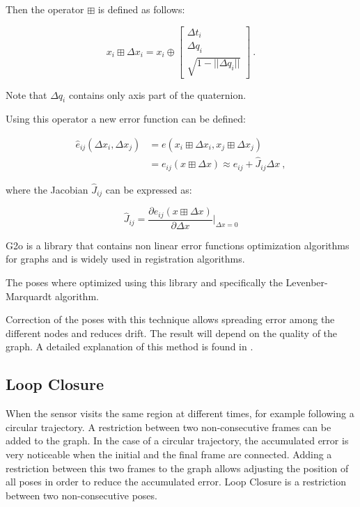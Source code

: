 Then the operator $\boxplus$ is defined as follows:

$$
x_i \boxplus \Delta x_i = x_i \oplus \begin{bmatrix} \Delta t_i \\ \Delta q_i \\ \sqrt{1-||\Delta q_i||}  \end{bmatrix} \ .
$$

Note that $\Delta q_i$ contains only axis part of the quaternion.

Using this operator a new error function can be defined:

\begin{equation}
\begin{aligned}
\hat{e}_{ij}(\Delta x_i,\Delta x_j) &= e(x_i \boxplus \Delta x_i,x_j \boxplus \Delta x_j) \\
&= e_{ij}(x \boxplus \Delta x) \approx e_{ij} + \hat{J}_{ij} \Delta x \ ,
\end{aligned}
\end{equation}

\noindent where the Jacobian $\hat{J}_{ij}$ can be expressed as:

$$
\hat{J}_{ij} = \frac{\partial{e_{ij}(x \boxplus \Delta x)}}{\partial{\Delta x}} \bigg|_{\Delta x=0}
$$


G2o is a library that contains non linear error functions optimization 
algorithms for graphs and is widely used in registration algorithms. 

The poses where optimized using this library and specifically the 
Levenber-Marquardt algorithm.

Correction of the poses with this technique allows spreading error among the different nodes and reduces drift. The result 
will depend on the quality of the graph. A detailed explanation of this method is found in \cite{g2o}.

\subsection{Loop Closure}

When the sensor visits the same region at different times, for example following 
a circular trajectory. A restriction between two non-consecutive frames can be 
added to the graph. In the case of a circular trajectory, the accumulated error 
is very noticeable when the initial and the final frame are connected. Adding a 
restriction between this two frames to the graph allows adjusting 
the position of all poses in order to reduce the accumulated error. Loop Closure is 
a restriction between two non-consecutive poses.


